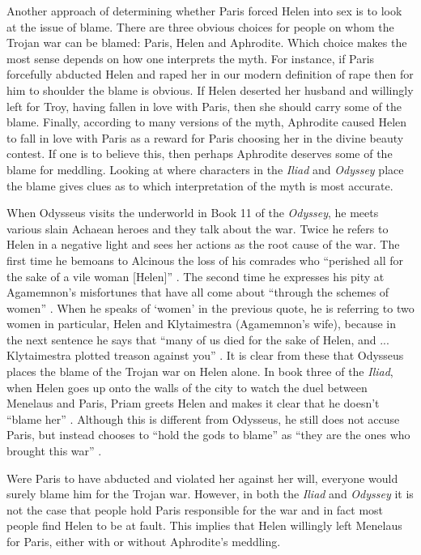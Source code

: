 \documentclass[11pt]{article}
\begin{document}
Another approach of determining whether Paris forced Helen into sex is to look at the issue of blame.
There are three obvious choices for people on whom the Trojan war can be blamed: Paris, Helen and Aphrodite.
Which choice makes the most sense depends on how one interprets the myth.
For instance, if Paris forcefully abducted Helen and raped her in our modern definition of rape then for him to shoulder the blame is obvious.
If Helen deserted her husband and willingly left for Troy, having fallen in love with Paris, then she should carry some of the blame.
Finally, according to many versions of the myth, Aphrodite caused Helen to fall in love with Paris as a reward for Paris choosing her in the divine beauty contest.
If one is to believe this, then perhaps Aphrodite deserves some of the blame for meddling.
Looking at where characters in the \emph{Iliad} and \emph{Odyssey} place the blame gives clues as to which interpretation of the myth is most accurate.

When Odysseus visits the underworld in Book 11 of the \emph{Odyssey}, he meets various slain Achaean heroes and they talk about the war.
Twice he refers to Helen in a negative light and sees her actions as the root cause of the war.
The first time he bemoans to Alcinous the loss of his comrades who ``perished all for the sake of a vile woman [Helen]'' \cite[book 11, line 384]{Odyssey}.
The second time he expresses his pity at Agamemnon's misfortunes that have all come about ``through the schemes of women'' \cite[book 11, line 438]{Odyssey}.
When he speaks of `women' in the previous quote, he is referring to two women in particular, Helen and Klytaimestra (Agamemnon's wife), because in the next sentence he says that ``many of us died for the sake of Helen, and ... Klytaimestra plotted treason against you'' \cite[book 11, line 438]{Odyssey}.
It is clear from these that Odysseus places the blame of the Trojan war on Helen alone.
In book three of the \emph{Iliad}, when Helen goes up onto the walls of the city to watch the duel between Menelaus and Paris, Priam greets Helen and makes it clear that he doesn't ``blame her'' \cite[book 3, line 198]{Iliad}.
Although this is different from Odysseus, he still does not accuse Paris, but instead chooses to ``hold the gods to blame'' as ``they are the ones who brought this war'' \cite[book 3, line 200]{Iliad}.

Were Paris to have abducted and violated her against her will, everyone would surely blame him for the Trojan war.
However, in both the \emph{Iliad} and \emph{Odyssey} it is not the case that people hold Paris responsible for the war and in fact most people find Helen to be at fault.
This implies that Helen willingly left Menelaus for Paris, either with or without Aphrodite's meddling.
\end{document}
